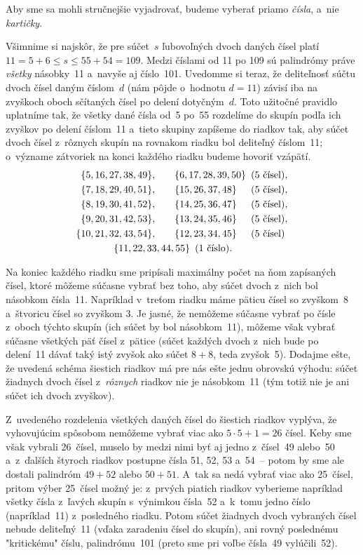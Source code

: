 {%
Aby sme sa mohli stručnejšie vyjadrovať, budeme
vyberať priamo {\it čísla}, a~nie {\it kartičky}.

Všimnime si najskôr, že pre súčet~$s$ ľubovoľných dvoch
daných čísel platí $11=5+6\le s\le55+54=109$.
Medzi číslami od 11 po 109 sú palindrómy práve {\it všetky\/}
násobky~11 a~navyše aj číslo~101.
Uvedomme si teraz, že deliteľnosť súčtu dvoch čísel daným číslom~$d$
(nám pôjde o~hodnotu $d=11$) závisí iba na zvyškoch
oboch sčítaných čísel po delení dotyčným~$d$. Toto užitočné pravidlo
uplatníme tak, že všetky dané čísla od~5 po~55
rozdelíme do skupín podľa ich zvyškov po delení číslom~11
a~tieto skupiny zapíšeme do riadkov tak,
aby súčet dvoch čísel z~rôznych skupín na rovnakom riadku bol deliteľný
číslom~11; o~význame zátvoriek na konci každého riadku budeme hovoriť
vzápätí.
$$
\alignedat3
&\phantom0\{5, 16, 27, 38, 49\},\qquad&&\{6, 17, 28, 39, 50\}\quad&&(5\ \text{čísel}), \\
&\phantom0\{7, 18, 29, 40, 51\}, &&\{15, 26, 37, 48\} &&(5\ \text{čísel}), \\
&\phantom0\{8, 19, 30, 41, 52\}, &&\{14, 25, 36, 47\} &&(5\ \text{čísel}), \\
&\phantom0\{9, 20, 31, 42, 53\}, &&\{13, 24, 35, 46\} &&(5\ \text{čísel}), \\
&\{10, 21, 32, 43, 54\}, &&\{12, 23, 34, 45\} &&(5\ \text{čísel})\\
&\span\span\{11, 22, 33, 44, 55\}\quad (1\ \text{číslo}).
\endaligned\\
$$

Na koniec každého riadku sme pripísali maximálny počet na ňom
zapísaných čísel, ktoré môžeme súčasne vybrať bez toho, aby súčet
dvoch z~nich bol násobkom čísla~11. Napríklad
v~treťom riadku máme päticu čísel so zvyškom~8 a~štvoricu čísel so
zvyškom 3. Je jasné, že nemôžeme súčasne vybrať po čísle z~oboch
týchto skupín (ich súčet by bol násobkom~11),
môžeme však vybrať súčasne všetkých päť čísel z~pätice (súčet
každých dvoch z~nich bude po delení~11 dávať taký istý zvyšok ako
súčet $8+8$, teda zvyšok~5). Dodajme ešte, že uvedená schéma
šiestich riadkov má pre nás ešte jednu obrovskú výhodu: súčet
žiadnych dvoch čísel z~{\it rôznych\/} riadkov nie je násobkom~11 (tým
totiž nie je ani súčet ich dvoch zvyškov).

Z~uvedeného rozdelenia všetkých daných čísel do šiestich riadkov vyplýva, že
vyhovujúcim spôsobom nemôžeme vybrať viac ako $5\cdot5+1=26$ čísel.
Keby sme však vybrali 26~čísel, muselo by medzi nimi byť aj jedno z~čísel~49 alebo~50
a~z~ďalších štyroch riadkov postupne čísla 51, 52, 53 a~54~--
potom by sme ale dostali palindróm $49+52$ alebo $50+51$.
A~tak sa nedá vybrať viac ako 25~čísel, pritom výber 25~čísel možný je:
z~prvých piatich riadkov vyberieme napríklad všetky čísla z~ľavých skupín s~výnimkou
čísla~52 a~k~tomu jedno číslo (napríklad~11) z~posledného riadku.
Potom súčet žiadnych dvoch vybraných čísel nebude deliteľný~11
(vďaka zaradeniu čísel do skupín), ani rovný
poslednému "kritickému" číslu, palindrómu~101 (preto sme
pri voľbe čísla~49 vylúčili~52).

}
